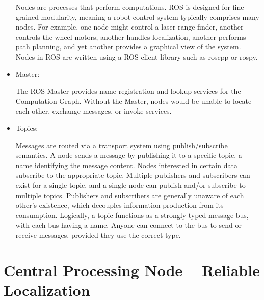\begin{itemize}
	Nodes are processes that perform computations. ROS is designed for fine-grained modularity, meaning a robot control system typically comprises many nodes. For example, one node might control a laser range-finder, another controls the wheel motors, another handles localization, another performs path planning, and yet another provides a graphical view of the system. Nodes in ROS are written using a ROS client library such as roscpp or rospy.
	
	\item Master: 
	
	The ROS Master provides name registration and lookup services for the Computation Graph. Without the Master, nodes would be unable to locate each other, exchange messages, or invoke services.
	\item Topics:
	
	Messages are routed via a transport system using publish/subscribe semantics. A node sends a message by publishing it to a specific topic, a name identifying the message content. Nodes interested in certain data subscribe to the appropriate topic. Multiple publishers and subscribers can exist for a single topic, and a single node can publish and/or subscribe to multiple topics. Publishers and subscribers are generally unaware of each other's existence, which decouples information production from its consumption. Logically, a topic functions as a strongly typed message bus, with each bus having a name. Anyone can connect to the bus to send or receive messages, provided they use the correct type.
\end{itemize}









\newpage
\chapter{Central Processing Node -- Reliable Localization}

